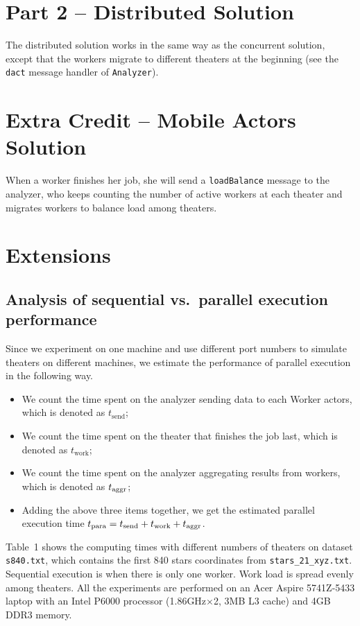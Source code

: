 \documentclass[12pt,letterpaper]{article}
\begin{document}
\section*{Part 2 -- Distributed Solution}
The distributed solution works in the same way as the concurrent solution, except that the workers migrate to different theaters at the beginning (see the \texttt{dact} message handler of \texttt{Analyzer}).

\section*{Extra Credit -- Mobile Actors Solution}
When a worker finishes her job, she will send a \texttt{loadBalance} message to the analyzer, who keeps counting the number of active workers at each theater and migrates workers to balance load among theaters.

\section*{Extensions}
\subsection*{Analysis of sequential vs.~parallel execution performance}
Since we experiment on one machine and use different port numbers to simulate theaters on different machines, we estimate the performance of parallel execution in the following way.
\begin{itemize}
\item We count the time spent on the analyzer sending data to each Worker actors, which is denoted as $t_{\textrm{send}}$;
\item We count the time spent on the theater that finishes the job last, which is denoted as $t_{\textrm{work}}$;
\item We count the time spent on the analyzer aggregating results from workers, which is denoted as $t_{\rm aggr}$;
\item Adding the above three items together, we get the estimated parallel execution time $t_{\rm para} = t_{\textrm{send}}+t_{\textrm{work}}+t_{\rm aggr}$.
\end{itemize}

Table~1 shows the computing times with different numbers of theaters on dataset \texttt{s840.txt}, which contains the first 840 stars coordinates from \texttt{stars_21_xyz.txt}. Sequential execution is when there is only one worker. Work load is spread evenly among theaters. All the experiments are performed on an Acer Aspire 5741Z-5433 laptop with an Intel P6000 processor (1.86GHz$\times$2, 3MB L3 cache) and 4GB DDR3 memory.
\end{document}
